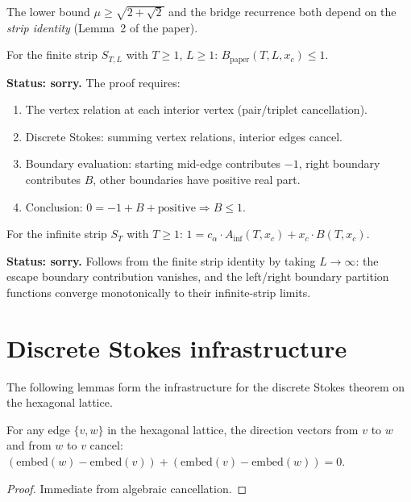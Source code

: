 \begin{lemma}
\begin{enumerate}
The lower bound $\mu \geq \sqrt{2+\sqrt{2}}$ and the bridge recurrence
both depend on the \emph{strip identity} (Lemma~2 of the paper).

\begin{theorem}\label{thm:B-le-one}
  For the finite strip $S_{T,L}$ with $T \geq 1$, $L \geq 1$:
  $B_{\text{paper}}(T,L,x_c) \leq 1$.

  \textbf{Status: sorry.} The proof requires:
  \begin{enumerate}
    \item The vertex relation at each interior vertex (pair/triplet cancellation).
    \item Discrete Stokes: summing vertex relations, interior edges cancel.
    \item Boundary evaluation: starting mid-edge contributes $-1$,
          right boundary contributes $B$, other boundaries have positive
          real part.
    \item Conclusion: $0 = -1 + B + \text{positive} \Rightarrow B \leq 1$.
  \end{enumerate}
\end{theorem}

\begin{theorem}\label{thm:inf-strip}
  For the infinite strip $S_T$ with $T \geq 1$:
  $1 = c_\alpha \cdot A_{\inf}(T, x_c) + x_c \cdot B(T, x_c)$.

  \textbf{Status: sorry.} Follows from the finite strip identity
  by taking $L \to \infty$: the escape boundary contribution vanishes,
  and the left/right boundary partition functions converge monotonically
  to their infinite-strip limits.
\end{theorem}

\section{Discrete Stokes infrastructure}

The following lemmas form the infrastructure for the discrete Stokes
theorem on the hexagonal lattice.

\begin{lemma}\label{lem:interior-cancel}
\leanok
  For any edge $\{v,w\}$ in the hexagonal lattice, the direction vectors
  from $v$ to $w$ and from $w$ to $v$ cancel:
  $(\text{embed}(w) - \text{embed}(v)) + (\text{embed}(v) - \text{embed}(w)) = 0$.
\end{lemma}
\begin{proof}
\leanok
  Immediate from algebraic cancellation.
\end{proof}


\end{enumerate}
\end{lemma}

